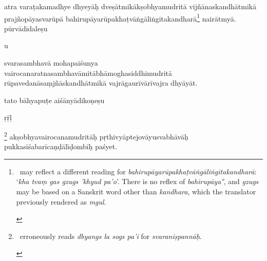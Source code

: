 \documentclass[naipra.tex]{subfiles}
\begin{document}
\begin{sanskrit}

\pstart
atra varaṭakamadhye dhyeyāḥ  dveṣātmikākṣobhyamudritā vijñānaskandhātmikā prajñopāyasvarūpā bahirupāyarūpakhaṭvāṅgāliṅgitakandharā\footnote{\begin{english}
	\TIB\ may reflect a different reading for \emph{bahirupāyarūpakhaṭvāṅgāliṅgitakandharā}: `\emph{kha tvaṃ gas gzugs 'khyud pa'o}'.
	There is no reflex of \emph{bahirupāya°}, and \emph{gzugs} may be based on a Sanskrit word other than \emph{kandhara}, which the translator previously rendered as \emph{mgul}.
\end{english}} nairātmyā.
pūrvādidaleṣu \begin{mantra}\dsh u\end{mantra}\dsh svarasambhavā mohapaiśunya vairocanaratnasambhavāmitābhāmoghasiddhimudritā rūpavedanāsaṃjñāskandhātmikā vajrāgaurīvārīvajra dhyāyāt. 
\pend




\pstart
tato bāhyapuṭe aiśānyādikoṇeṣu \begin{mantra}\dsh ṛ\dsh ṝ\dsh ḷ\end{mantra}\dsh {}\footnote{\begin{english}
	\TIB\ erroneously reads \emph{dbyangs la sogs pa'i} for \emph{svaraniṣpannāḥ}. 
\end{english}} akṣobhyavairocanamudritāḥ pṛthivyāptejovāyusvabhāvāḥ pukkasīśabarīcaṇḍālīḍombīḥ paśyet. 
\pend


\end{sanskrit}
\end{document}
